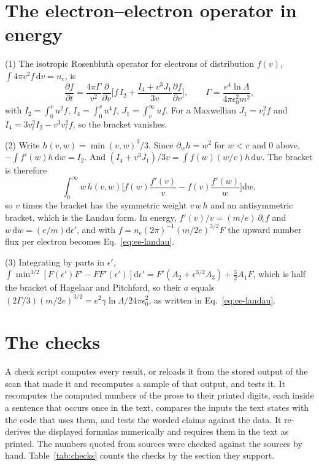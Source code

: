 \documentclass[11pt]{article}
\numberwithin{equation}{section}
\newcommand{\dd}{\mathrm d}
\newcommand{\lnL}{\ln\Lambda}
\begin{document}
\section{The electron--electron operator in energy}
\label{app:ee}

{\noindent}(1) The isotropic Rosenbluth operator for electrons of distribution
$f(v)$, $\int4\pi v^2f\,\dd v=n_e$, is \cite{Rosenbluth1957}
\begin{equation}
\frac{\partial f}{\partial t}=\frac{4\pi\Gamma}{v^2}\frac{\partial}{\partial v}
\Big[f\,I_2+\frac{I_4+v^3J_1}{3v}\frac{\partial f}{\partial v}\Big],\qquad
\Gamma=\frac{e^4\lnL}{4\pi\epsilon_0^2m^2},
\end{equation}
with $I_2=\int_0^vu^2f$, $I_4=\int_0^vu^4f$, $J_1=\int_v^\infty uf$. For a
Maxwellian $J_1=v_t^2f$ and $I_4=3v_t^2I_2-v^3v_t^2f$, so the bracket vanishes.

{\noindent}(2) Write $h(v,w)=\min(v,w)^3/3$. Since $\partial_wh=w^2$ for $w<v$
and 0 above, $-\int f'(w)h\,\dd w=I_2$. And $(I_4+v^3J_1)/3v=\int f(w)(w/v)h\,\dd w$.
The bracket is therefore
\begin{equation}
\int_0^\infty w\,h(v,w)\Big[f(w)\frac{f'(v)}{v}-f(v)\frac{f'(w)}{w}\Big]\dd w,
\end{equation}
so $v$ times the bracket has the symmetric weight $v\,w\,h$ and an antisymmetric
bracket, which is the Landau form. In energy, $f'(v)/v=(m/e)\,\partial_\epsilon f$ and
$w\,\dd w=(e/m)\dd\epsilon'$, and with $f=n_e(2\pi)^{-1}(m/2e)^{3/2}F$ the upward
number flux per electron becomes Eq.~\eqref{eq:ee-landau}.

{\noindent}(3) Integrating by parts in $\epsilon'$,
$\int\min^{3/2}[F(\epsilon')F'-FF'(\epsilon')]\dd\epsilon'=F'(A_2+\epsilon^{3/2}A_3)+\tfrac32A_1F$,
which is half the bracket of Hagelaar and Pitchford, so their $a$ \cite{HP2005}
equals $(2\Gamma/3)(m/2e)^{3/2}=e^2\gamma\lnL/24\pi\epsilon_0^2$, as written in
Eq.~\eqref{eq:ee-landau}.

\section{The checks}
\label{app:checks}

\noindent A check script computes every result, or reloads it from the stored output
of the scan that made it and recomputes a sample of that output, and tests it. It
recomputes the computed numbers of the prose to their printed digits, each inside a
sentence that occurs once in the text, compares the inputs the text states with the
code that uses them, and tests the worded claims against the data. It re-derives the
displayed formulas numerically and requires them in the text as printed. The numbers
quoted from sources were checked against the sources by hand. Table~\ref{tab:checks}
counts the checks by the section they support.
\end{document}
